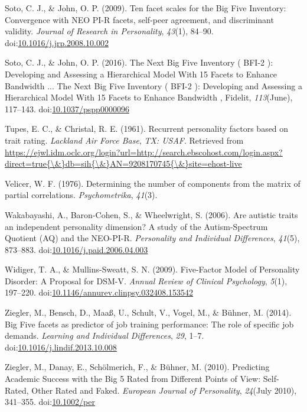 \documentclass[,man,floatsintext]{apa6}
\begin{document}
\hypertarget{ref-SotoJohn2009}{}
Soto, C. J., \& John, O. P. (2009). Ten facet scales for the Big Five
Inventory: Convergence with NEO PI-R facets, self-peer agreement, and
discriminant validity. \emph{Journal of Research in Personality},
\emph{43}(1), 84--90.
doi:\href{https://doi.org/10.1016/j.jrp.2008.10.002}{10.1016/j.jrp.2008.10.002}

\hypertarget{ref-SotoJohn2016}{}
Soto, C. J., \& John, O. P. (2016). The Next Big Five Inventory ( BFI-2
): Developing and Assessing a Hierarchical Model With 15 Facets to
Enhance Bandwidth ... The Next Big Five Inventory ( BFI-2 ): Developing
and Assessing a Hierarchical Model With 15 Facets to Enhance Bandwidth ,
Fidelit, \emph{113}(June), 117--143.
doi:\href{https://doi.org/10.1037/pspp0000096}{10.1037/pspp0000096}

\hypertarget{ref-TupesChristal1961}{}
Tupes, E. C., \& Christal, R. E. (1961). Recurrent personality factors
based on trait rating. \emph{Lackland Air Force Base}, \emph{TX: USAF}.
Retrieved from
\href{https://ejwl.idm.oclc.org/login?url=http://search.ebscohost.com/login.aspx?direct=true\%7B/\&\%7Ddb=sih\%7B/\&\%7DAN=9208170745\%7B/\&\%7Dsite=ehost-live}{https://ejwl.idm.oclc.org/login?url=http://search.ebscohost.com/login.aspx?direct=true\{\textbackslash{}\&\}db=sih\{\textbackslash{}\&\}AN=9208170745\{\textbackslash{}\&\}site=ehost-live}

\hypertarget{ref-Velicer1976}{}
Velicer, W. F. (1976). Determining the number of components from the
matrix of partial correlations. \emph{Psychometrika}, \emph{41}(3).

\hypertarget{ref-Wakabayashi2006}{}
Wakabayashi, A., Baron-Cohen, S., \& Wheelwright, S. (2006). Are
autistic traits an independent personality dimension? A study of the
Autism-Spectrum Quotient (AQ) and the NEO-PI-R. \emph{Personality and
Individual Differences}, \emph{41}(5), 873--883.
doi:\href{https://doi.org/10.1016/j.paid.2006.04.003}{10.1016/j.paid.2006.04.003}

\hypertarget{ref-WidigerMullins2009}{}
Widiger, T. A., \& Mullins-Sweatt, S. N. (2009). Five-Factor Model of
Personality Disorder: A Proposal for DSM-V. \emph{Annual Review of
Clinical Psychology}, \emph{5}(1), 197--220.
doi:\href{https://doi.org/10.1146/annurev.clinpsy.032408.153542}{10.1146/annurev.clinpsy.032408.153542}

\hypertarget{ref-Ziegler2014}{}
Ziegler, M., Bensch, D., Maaß, U., Schult, V., Vogel, M., \& Bühner, M.
(2014). Big Five facets as predictor of job training performance: The
role of specific job demands. \emph{Learning and Individual
Differences}, \emph{29}, 1--7.
doi:\href{https://doi.org/10.1016/j.lindif.2013.10.008}{10.1016/j.lindif.2013.10.008}

\hypertarget{ref-Ziegler2010}{}
Ziegler, M., Danay, E., Schölmerich, F., \& Bühner, M. (2010).
Predicting Academic Success with the Big 5 Rated from Different Points
of View: Self-Rated, Other Rated and Faked. \emph{European Journal of
Personality}, \emph{24}(July 2010), 341--355.
doi:\href{https://doi.org/10.1002/per}{10.1002/per}

\endgroup

\clearpage

\renewcommand{\listtablename}{Table captions}

\listoftables
\end{document}
